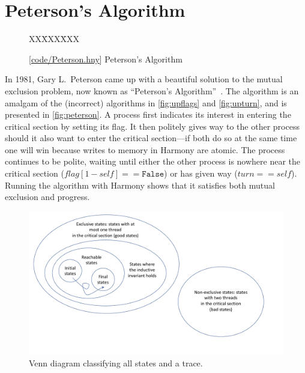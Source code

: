 \documentclass{report}
\newcommand{\harmonysource}[1]{
\begin{tabbing}
XX\=XXX\=XXX\kill
    
\end{tabbing}
}
\newcommand{\harmonylink}[1]{%
[\href{https://www.cs.cornell.edu/home/rvr/harmony/#1}{\underline{#1}}]%
}
\newenvironment{code}{
\tcolorbox
}{
\endtcolorbox
}
\begin{document}
\chapter{Peterson's Algorithm}
\label{ch:peterson}
%

\begin{figure}
\begin{code}
\harmonysource{Peterson}
\end{code}
\caption{\harmonylink{code/Peterson.hny} Peterson's Algorithm}
\label{fig:peterson}
\end{figure}

In 1981, Gary L.~Peterson came up with a beautiful solution to the mutual exclusion
problem, now known as ``Peterson's Algorithm''~\cite{Peterson81}.
The algorithm is an amalgam of the (incorrect) algorithms in
\autoref{fig:upflags} and \autoref{fig:upturn}, and is presented
in \autoref{fig:peterson}.
A process first indicates its interest in entering the critical section
by setting its flag.
It then politely gives way to the other process should it also want to
enter the critical section---if both do so at the same time one will
win because writes to memory in Harmony are atomic.
The process continues to be polite, waiting
until either the other process is nowhere near the critical section
($\mathit{flag}[1 - \mathit{self}] == \mathtt{False}$) or has given way
($\mathit{turn} == \mathit{self}$).
Running the algorithm with Harmony shows that it satisfies both mutual
exclusion and progress.

\begin{figure}
\begin{center}
\includegraphics[width=6in]{figures/states-crop.pdf}
\end{center}
\caption{Venn diagram classifying all states and a trace.}
\label{fig:states}
\end{figure}
\end{document}
